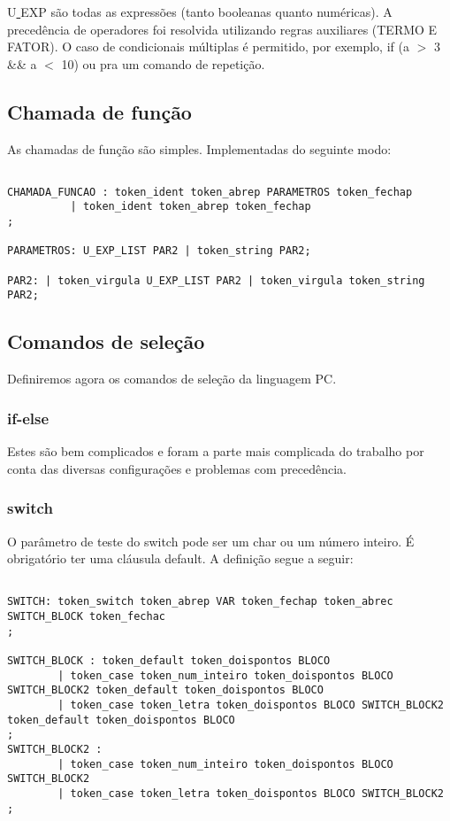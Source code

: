\documentclass[a4paper,10pt]{article}
\begin{document}
U\underline{ }EXP são todas as expressões (tanto booleanas quanto numéricas). A precedência de operadores foi resolvida utilizando regras auxiliares (TERMO E FATOR).
O caso de condicionais múltiplas é permitido, por exemplo, if (a $>$ 3 \&\& a $<$ 10) ou pra um comando de repetição.

\subsection{Chamada de função}

As chamadas de função são simples. Implementadas do seguinte modo:

\begin{verbatim}

CHAMADA_FUNCAO : token_ident token_abrep PARAMETROS token_fechap
		  | token_ident token_abrep token_fechap
;

PARAMETROS: U_EXP_LIST PAR2 | token_string PAR2;

PAR2: | token_virgula U_EXP_LIST PAR2 | token_virgula token_string PAR2;

\end{verbatim}

\subsection{Comandos de seleção}

Definiremos agora os comandos de seleção da linguagem PC.

\subsubsection{if-else}

Estes são bem complicados e foram a parte mais complicada do trabalho por conta das diversas configurações e problemas com precedência.

\subsubsection{switch}

O parâmetro de teste do switch pode ser um char ou um número inteiro. É obrigatório ter uma cláusula default. A definição segue a seguir:

\begin{verbatim}

SWITCH: token_switch token_abrep VAR token_fechap token_abrec SWITCH_BLOCK token_fechac
;

SWITCH_BLOCK : token_default token_doispontos BLOCO 
		| token_case token_num_inteiro token_doispontos BLOCO SWITCH_BLOCK2 token_default token_doispontos BLOCO
		| token_case token_letra token_doispontos BLOCO SWITCH_BLOCK2 token_default token_doispontos BLOCO
;
SWITCH_BLOCK2 : 
		| token_case token_num_inteiro token_doispontos BLOCO SWITCH_BLOCK2
		| token_case token_letra token_doispontos BLOCO SWITCH_BLOCK2 
;
\end{verbatim}
\end{document}

